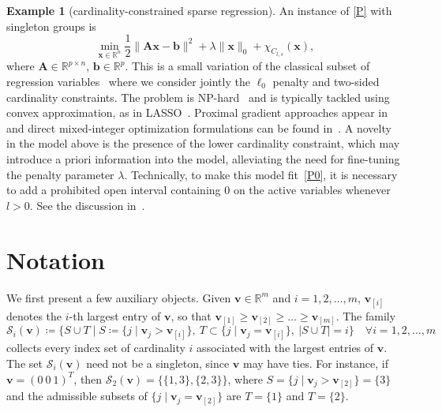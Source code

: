 \documentclass[11pt,a4paper]{article}
\theoremstyle{plain}
\theoremstyle{definition}
\newtheorem{example}{Example}
\theoremstyle{remark}
\newcommand*\R{\mathbb{R}}
\newcommand*\x{\mathbf{x}}
\newcommand*\V{\mathbf{v}}
\newcommand*\bv{\mathbf{b}}
\newcommand*\A{\mathbf{A}}
\begin{document}
\begin{example}[cardinality-constrained sparse regression]
  \label{ex:sparsereg}
  An instance of \eqref{P} with singleton groups is
  \begin{equation}
    \label{regress2}
    \min_{\x\in\R^n}\frac{1}{2}\|\A\x-\bv\|^2+\lambda\|\x\|_0+\chi_{C_{l,s}}(\x),
  \end{equation}
  where \(\A\in \R^{p \times n}\), \(\bv\in \R^p\).
  This is a small variation of the classical subset of regression variables~\cite{miller1984} where we consider jointly the $\ell_0$ penalty and two-sided cardinality constraints.
  The problem is NP-hard~\cite{natarajan1995} and is typically tackled using convex approximation, as in LASSO~\cite{tibshirani1996}.
  Proximal gradient approaches appear in~\cite{blumensath2008,beck2018} and direct mixed-integer optimization formulations can be found in~\cite{bertsimas2016}.
  A novelty in the model above is the presence of the lower cardinality constraint, which may introduce a priori information into the model, alleviating the need for fine-tuning the penalty parameter $\lambda$.
  Technically, to make this model fit~\eqref{P0}, it is necessary to add a prohibited open interval containing \( 0 \) on the active variables whenever \( l > 0 \).
  See the discussion in~.

\end{example}

\section{Notation}
\label{sec:notation}

We first present a few auxiliary objects.
Given \(\V \in \R^m\) and \(i=1,2,\ldots,m\), \(\V_{[i]}\) denotes the \(i\)-th largest entry of \(\V\), so that \(\V_{[1]}\geq \V_{[2]}\geq\hdots\geq\V_{[m]}\).
The family
\begin{equation}\label{defS}
  \mathcal{S}_i(\V)\coloneqq\{S \cup T\mid S\coloneqq\{j\mid\V_j>\V_{[i]}\},\ T\subset\{j\mid\V_j=\V_{[i]}\},\ | S \cup T | = i\}\quad \forall i=1,2,\ldots,m
\end{equation}
collects every index set of cardinality \(i\) associated with the largest
entries of \(\V\).
The set \(\mathcal{S}_i(\V)\) need not be a singleton, since \(\V\) may have ties.
For instance, if \(\V = (0\ 0\ 1)^T\), then \(\mathcal{S}_2(\V) = \{\{1,3\},\{2,3\}\}\), where \(S=\{j\mid\V_j>\V_{[2]}\}=\{3\}\) and the admissible subsets of \(\{j\mid\V_j=\V_{[2]}\}\) are \(T=\{1\}\) and \(T=\{2\}\).
\end{document}
